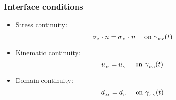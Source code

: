 \begin{frame}
  \frametitle{Interface conditions}

\begin{figure}[htbp]
  \def\svgwidth{0.3\columnwidth}
  
\end{figure}
  
  \begin{itemize}[<+->]
 \item
  Stress continuity:
  \begin{equation*}
    \sigma_{_{S}} \cdot n = \sigma_{_{F}} \cdot n
    \quad \text{ on } \gamma_{_{FS}}(t)
  \end{equation*}
 \item
  Kinematic continuity:
  \begin{equation*} 
    u_{_{F}} = u_{_{S}}
    \quad \text{ on } \gamma_{_{FS}}(t)
   \end{equation*}
 \item
  Domain continuity:
  \begin{equation*}
    d_{_{M}} = d_{_{S}}
    \quad \text{ on } \gamma_{_{FS}}(t)
  \end{equation*}
\end{itemize}
\end{frame}
